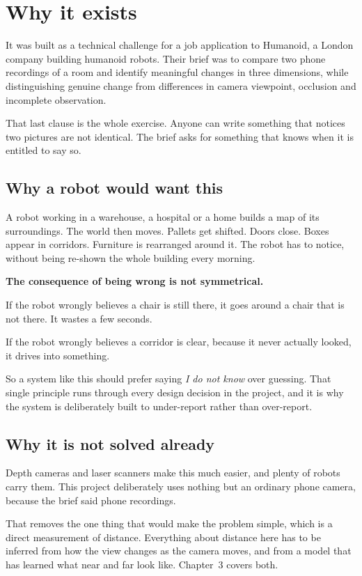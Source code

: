 \chapter{Why it exists}

It was built as a technical challenge for a job application to Humanoid, a London company building
humanoid robots. Their brief was to compare two phone recordings of a room and identify meaningful
changes in three dimensions, while distinguishing genuine change from differences in camera
viewpoint, occlusion and incomplete observation.

That last clause is the whole exercise. Anyone can write something that notices two pictures are
not identical. The brief asks for something that knows when it is entitled to say so.

\section{Why a robot would want this}

A robot working in a warehouse, a hospital or a home builds a map of its surroundings. The world
then moves. Pallets get shifted. Doors close. Boxes appear in corridors. Furniture is rearranged
around it. The robot has to notice, without being re-shown the whole building every morning.

\begin{plainbox}
\textbf{The consequence of being wrong is not symmetrical.}

If the robot wrongly believes a chair is still there, it goes around a chair that is not there. It
wastes a few seconds.

If the robot wrongly believes a corridor is clear, because it never actually looked, it drives into
something.
\end{plainbox}

So a system like this should prefer saying \emph{I do not know} over guessing. That single
principle runs through every design decision in the project, and it is why the system is
deliberately built to under-report rather than over-report.

\section{Why it is not solved already}

Depth cameras and laser scanners make this much easier, and plenty of robots carry them. This
project deliberately uses nothing but an ordinary phone camera, because the brief said phone
recordings.

That removes the one thing that would make the problem simple, which is a direct measurement of
distance. Everything about distance here has to be inferred from how the view changes as the camera
moves, and from a model that has learned what near and far look like. Chapter~3 covers both.
